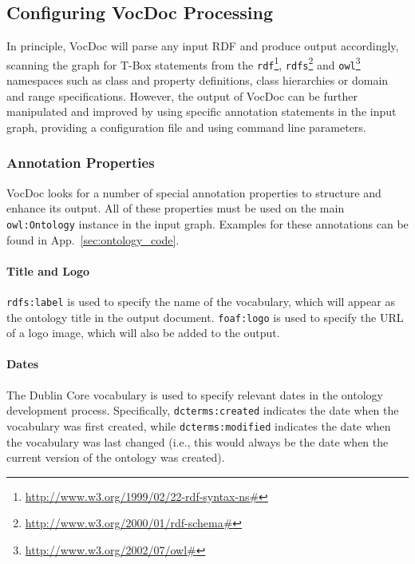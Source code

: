 \documentclass{article}
\begin{document}
\subsection{Configuring VocDoc Processing} %
\label{sub:configuration}

In principle, VocDoc will parse any input RDF and produce output accordingly, scanning the graph for T-Box statements from the \texttt{rdf}\footnote{\url{http://www.w3.org/1999/02/22-rdf-syntax-ns\#}}, 
\texttt{rdfs}\footnote{\url{http://www.w3.org/2000/01/rdf-schema\#}} and 
\texttt{owl}\footnote{\url{http://www.w3.org/2002/07/owl\#}} 
namespaces such as class and property definitions, class hierarchies or domain and range specifications. However, the output of VocDoc can be further manipulated and improved by using specific annotation statements in the input graph, providing a configuration file and using command line parameters.

\subsubsection{Annotation Properties} %
\label{ssub:annotation_properties}

VocDoc looks for a number of special annotation properties to structure and enhance its output. All of these properties must be used on the main \texttt{owl:Ontology} instance in the input graph. Examples for these annotations can be found in App.~\ref{sec:ontology_code}.

\paragraph{Title and Logo} %
\label{par:title_and_logo}

\texttt{rdfs:label} is used to specify the name of the vocabulary, which will appear as the ontology title in the output document. \texttt{foaf:logo} is used to specify the URL of a logo image, which will also be added to the output.


\paragraph{Dates} %
\label{par:dates}

The Dublin Core vocabulary is used to specify relevant dates in the ontology development process. Specifically, \texttt{dcterms:created} indicates the date when the vocabulary was first created, while \texttt{dcterms:modified} indicates the date when the vocabulary was last changed (i.e., this would always be the date when the current version of the ontology was created).
\end{document}

